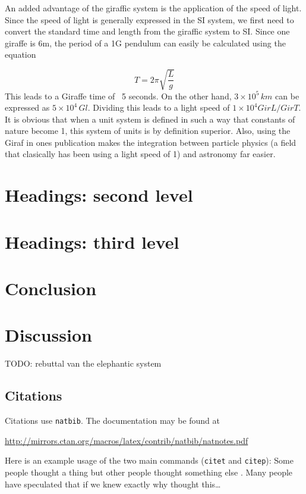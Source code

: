 \documentclass{article}
\begin{document}
An added advantage of the giraffic system is the application of the speed of light. Since the speed of light is generally expressed in the SI system, we first need to convert the standard time and length from the giraffic system to SI. Since one giraffe is 6m, the period of a 1G pendulum can easily be calculated using the equation

\begin{equation}
 T = 2\pi \sqrt{\frac{L}{g}}
\end{equation}
This leads to a Giraffe time of ~5 seconds. On the other hand, $3\times10^{5}\,km$ can be expressed as $5\times10^{4}\,Gl$. Dividing this leads to a light speed of $1\times10^{4} GirL/GirT$. It is obvious that when a unit system is defined in such a way that constants of nature become 1, this system of units is by definition superior. Also, using the Giraf in ones publication makes the integration between particle physics (a field that clasically has been using a light speed of 1) and astronomy far easier. 

\section{Headings: second level}


\section{Headings: third level}


\section{Conclusion}

\section{Discussion}
TODO: rebuttal van the elephantic system





\subsection{Citations}
Citations use \verb+natbib+. The documentation may be found at
\begin{center}
	\url{http://mirrors.ctan.org/macros/latex/contrib/natbib/natnotes.pdf}
\end{center}

Here is an example usage of the two main commands (\verb+citet+ and \verb+citep+): Some people thought a thing \citep{kour2014real, hadash2018estimate} but other people thought something else \citep{kour2014fast}. Many people have speculated that if we knew exactly why \citet{kour2014fast} thought this\dots
\end{document}
